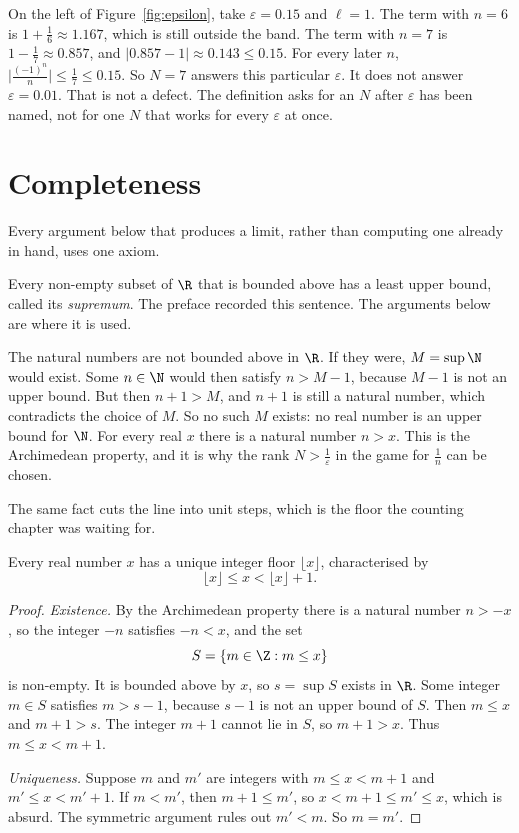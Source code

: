 On the left of Figure~\ref{fig:epsilon}, take $\varepsilon=0.15$ and $\ell=1$. The term with $n=6$ is $1+\frac16\approx1.167$, which is still outside the band. The term with $n=7$ is $1-\frac17\approx0.857$, and $\bigl|0.857-1\bigr|\approx0.143\le0.15$. For every later $n$, $\bigl|\frac{(-1)^n}n\bigr|\le\frac17\le0.15$. So $N=7$ answers this particular $\varepsilon$. It does not answer $\varepsilon=0.01$. That is not a defect. The definition asks for an $N$ after $\varepsilon$ has been named, not for one $N$ that works for every $\varepsilon$ at once.

\section{Completeness}

Every argument below that produces a limit, rather than computing one already in hand, uses one axiom.

\begin{definitionx}[completeness of $\R$]
Every non-empty subset of $\R$ that is bounded above has a least upper bound, called its \emph{supremum}. The preface recorded this sentence. The arguments below are where it is used.
\end{definitionx}

The natural numbers are not bounded above in $\R$. If they were, $M=\sup\N$ would exist. Some $n\in\N$ would then satisfy $n>M-1$, because $M-1$ is not an upper bound. But then $n+1>M$, and $n+1$ is still a natural number, which contradicts the choice of $M$. So no such $M$ exists: no real number is an upper bound for $\N$. For every real $x$ there is a natural number $n>x$. This is the Archimedean property, and it is why the rank $N>\frac1\varepsilon$ in the game for $\frac1n$ can be chosen.

The same fact cuts the line into unit steps, which is the floor the counting chapter was waiting for.

\begin{proposition}\label{prop:floor}
Every real number $x$ has a unique integer floor $\lfloor x\rfloor$, characterised by
\[
\lfloor x\rfloor\le x<\lfloor x\rfloor+1.
\]
\end{proposition}
\begin{proof}
\emph{Existence.} By the Archimedean property there is a natural number $n>-x$, so the integer $-n$ satisfies $-n<x$, and the set
\[
S=\{m\in\Z:m\le x\}
\]
is non-empty. It is bounded above by $x$, so $s=\sup S$ exists in $\R$. Some integer $m\in S$ satisfies $m>s-1$, because $s-1$ is not an upper bound of $S$. Then $m\le x$ and $m+1>s$. The integer $m+1$ cannot lie in $S$, so $m+1>x$. Thus $m\le x<m+1$.

\emph{Uniqueness.} Suppose $m$ and $m'$ are integers with $m\le x<m+1$ and $m'\le x<m'+1$. If $m<m'$, then $m+1\le m'$, so $x<m+1\le m'\le x$, which is absurd. The symmetric argument rules out $m'<m$. So $m=m'$.
\end{proof}

